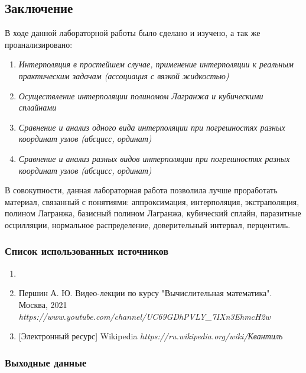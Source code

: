 \subsection{Заключение}
В ходе данной лабораторной работы было сделано и изучено, а так же проанализировано:
\begin{enumerate}
	\item \textit{Интерполяция в простейшем случае, применение интерполяции к реальным практическим задачам (ассоциация с вязкой жидкостью)}
	\item \textit{Осуществление интерполяции полиномом Лагранжа и кубическими сплайнами}
	\item \textit{Сравнение и анализ одного вида интерполяции при погрешностях разных координат узлов (абсцисс, ординат)}
	\item \textit{Сравнение и анализ разных видов интерполяции при погрешностях разных координат узлов (абсцисс, ординат)}
\end{enumerate}
\begin{flushleft}
В совокупности, данная лабораторная работа позволила лучше проработать материал, связанный с понятиями: аппроксимация, интерполяция, экстраполяция, полином Лагранжа, базисный полином Лагранжа, кубический сплайн, паразитные осцилляции, нормальное распределение, доверительный интервал, перцентиль.
\end{flushleft}
\subsubsection*{Список использованных источников}

\begin{enumerate}
	\item {}
    \item Першин А. Ю. Видео-лекции по курсу "Вычислительная математика". Москва, 2021
    \textit{https://www.youtube.com/channel/UC69GDhPVLY_7IXn3EhmcH2w}
    \item \textrm{[Электронный ресурс]} Wikipedia
    \textit{https://ru.wikipedia.org/wiki/Квантиль}
\end{enumerate}

\subsubsection*{Выходные данные}

\textit{\DocOutReference}

